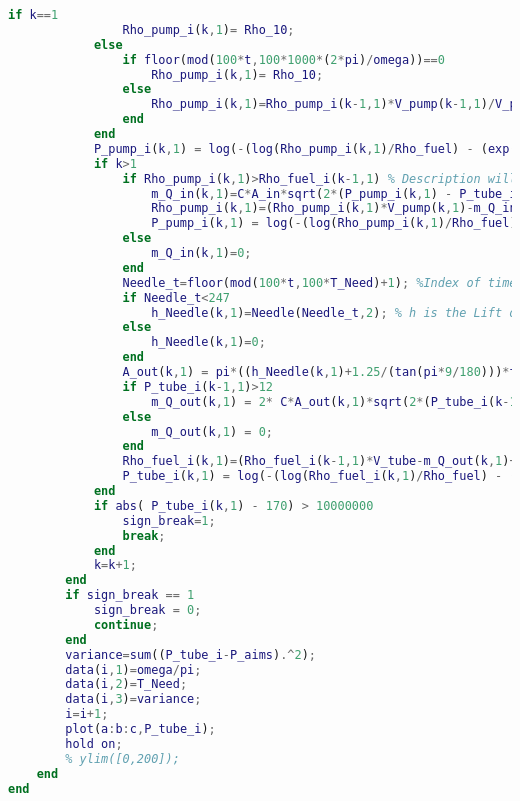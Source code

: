 \documentclass[withoutpreface,bwprint]{cumcmthesis} %
\begin{document}
\begin{appendices}
\begin{lstlisting}[language=matlab]
            if k==1
                Rho_pump_i(k,1)= Rho_10; 
            else
                if floor(mod(100*t,100*1000*(2*pi)/omega))==0
                    Rho_pump_i(k,1)= Rho_10;
                else
                    Rho_pump_i(k,1)=Rho_pump_i(k-1,1)*V_pump(k-1,1)/V_pump(k,1); % Fuel density in the oil pump at the current time.
                end
            end
            P_pump_i(k,1) = log(-(log(Rho_pump_i(k,1)/Rho_fuel) - (exp(-0.39)/(0.0039*exp(7.31))))*0.0039*exp(7.31))*(-1/0.0039);
            if k>1 
                if Rho_pump_i(k,1)>Rho_fuel_i(k-1,1) % Description will supply oil.
                    m_Q_in(k,1)=C*A_in*sqrt(2*(P_pump_i(k,1) - P_tube_i(k-1,1))*Rho_pump_i(k,1))*b;
                    Rho_pump_i(k,1)=(Rho_pump_i(k,1)*V_pump(k,1)-m_Q_in(k,1))/V_pump(k,1);
                    P_pump_i(k,1) = log(-(log(Rho_pump_i(k,1)/Rho_fuel) - (exp(-0.39)/(0.0039*exp(7.31))))*0.0039*exp(7.31))*(-1/0.0039);
                else
                    m_Q_in(k,1)=0;
                end
                Needle_t=floor(mod(100*t,100*T_Need)+1); %Index of time t in Needle data
                if Needle_t<247 
                    h_Needle(k,1)=Needle(Needle_t,2); % h is the Lift of Needle.
                else
                    h_Needle(k,1)=0;
                end
                A_out(k,1) = pi*((h_Needle(k,1)+1.25/(tan(pi*9/180)))*tan(pi*9/180))^2-pi*1.25^2;
                if P_tube_i(k-1,1)>12 
                    m_Q_out(k,1) = 2* C*A_out(k,1)*sqrt(2*(P_tube_i(k-1,1) - 12)*Rho_fuel_i(k-1,1))*b;
                else
                    m_Q_out(k,1) = 0;
                end
                Rho_fuel_i(k,1)=(Rho_fuel_i(k-1,1)*V_tube-m_Q_out(k,1)+m_Q_in(k,1))/V_tube;
                P_tube_i(k,1) = log(-(log(Rho_fuel_i(k,1)/Rho_fuel) - (exp(-0.39)/(0.0039*exp(7.31))))*0.0039*exp(7.31))*(-1/0.0039);
            end
            if abs( P_tube_i(k,1) - 170) > 10000000
                sign_break=1;
                break;
            end
            k=k+1;
        end
        if sign_break == 1
            sign_break = 0;
            continue;
        end
        variance=sum((P_tube_i-P_aims).^2);
        data(i,1)=omega/pi;
        data(i,2)=T_Need;
        data(i,3)=variance;
        i=i+1;
        plot(a:b:c,P_tube_i);
        hold on;
        % ylim([0,200]);
    end
end
\end{lstlisting}


\end{appendices}
\end{document}

